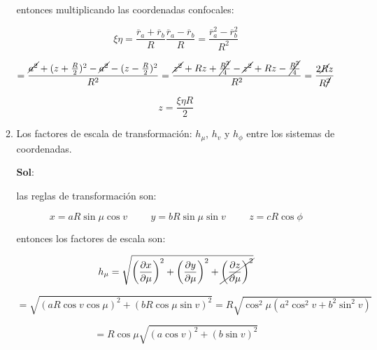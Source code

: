 \documentclass[12pt,a4paper]{article}
\begin{document}
\begin{enumerate}
\begin{enumerate}
    entonces multiplicando las coordenadas confocales:
    
    \begin{equation*}
        \xi \eta = \frac{\overline{r}_a + \overline{r}_b}{R}\frac{\overline{r}_a - \overline{r}_b}{R}= \frac{\overline{r}_{a}^{2} - \overline{r}_{b}^{2}}{R^2}
    \end{equation*}
    
    \begin{equation*}
        = \frac{\cancel{a^2}+(z+\frac{R}{2})^2-\cancel{a^2} - (z- \frac{R}{2})^2}{R^2}= \frac{\cancel{z^2} +Rz+ \cancel{\frac{R^2}{4}}-\cancel{z^2} + Rz - \cancel{\frac{R^2}{4}}}{R^2} = \frac{2\cancel{R}z}{R\cancel{^2}}
    \end{equation*}
    
    \begin{equation*}
        z = \frac{\xi \eta R}{2}
    \end{equation*}
    
    \item Los factores de escala de transformación: $h_{\mu}$, $h_{v}$ y $h_{\phi}$ entre los sistemas de coordenadas.
    
    \textbf{Sol}:
    
    las reglas de transformación son:
    
    \begin{equation*}
        x = a R \sin{\mu} \cos{v} \hspace{1cm} y = b R \sin{\mu} \sin{v} \hspace{1cm} z = c R \cos{\phi}
    \end{equation*}
    
    entonces los factores de escala son:
    
    \begin{equation*}
        h_\mu = \sqrt{\left(\frac{\partial x}{\partial \mu}\right)^2 + \left(\frac{\partial y}{\partial \mu}\right)^2 + \cancel{\left(\frac{\partial z}{\partial \mu}\right)^2}}
    \end{equation*}
    
    \begin{equation*}
        = \sqrt{\left(aR \cos{v}\cos{\mu}\right)^2 + \left(bR\cos{\mu}\sin{v}\right)^{2}} = R\sqrt{\cos^2{\mu}(a^2\cos^2{v}+b^2\sin^2{v})}
    \end{equation*}
    
    \begin{equation*}
        = R\cos{\mu}\sqrt{(a\cos{v})^2+(b\sin{v})^2}
    \end{equation*}
    

\end{enumerate}
\end{enumerate}
\end{document}

